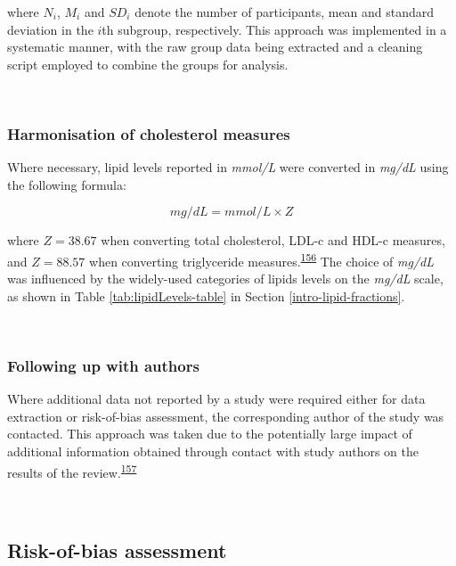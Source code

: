 \documentclass[a4paper, twoside]{templates/ociamthesis}
\begin{document}
where \(N_i\), \(M_i\) and \(SD_i\) denote the number of participants, mean and standard deviation in the \(i\)th subgroup, respectively. This approach was implemented in a systematic manner, with the raw group data being extracted and a cleaning script employed to combine the groups for analysis.

~

\hypertarget{harmonisation-of-cholesterol-measures}{%
\subsubsection{Harmonisation of cholesterol measures}\label{harmonisation-of-cholesterol-measures}}

Where necessary, lipid levels reported in \emph{mmol/L} were converted in \emph{mg/dL} using the following formula:

\begin{equation} 
  mg/dL = mmol/L \times{} Z
  \label{eq:lipidConversion}
\end{equation}

where \(Z = 38.67\) when converting total cholesterol, LDL-c and HDL-c measures, and \(Z = 88.57\) when converting triglyceride measures.\textsuperscript{\protect\hyperlink{ref-rugge2011}{156}} The choice of \emph{mg/dL} was influenced by the widely-used categories of lipids levels on the \emph{mg/dL} scale, as shown in Table \ref{tab:lipidLevels-table} in Section \ref{intro-lipid-fractions}.

~

\hypertarget{contacting-authors}{%
\subsubsection{Following up with authors}\label{contacting-authors}}

Where additional data not reported by a study were required either for data extraction or risk-of-bias assessment, the corresponding author of the study was contacted. This approach was taken due to the potentially large impact of additional information obtained through contact with study authors on the results of the review.\textsuperscript{\protect\hyperlink{ref-reynders2019}{157}}

~

\hypertarget{risk-of-bias}{%
\subsection{Risk-of-bias assessment}\label{risk-of-bias}}
\end{document}
